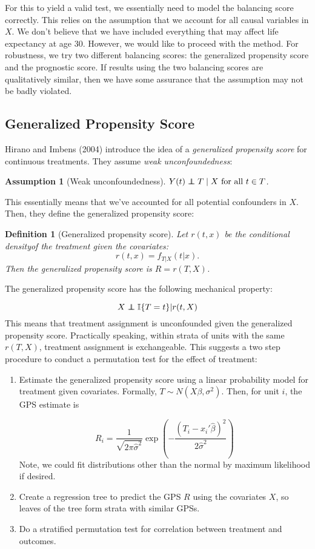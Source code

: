 \documentclass[11pt]{article}\usepackage[]{graphicx}\usepackage[]{color}
\newtheorem{assumption}{Assumption}
\newtheorem{definition}{Definition}
\newcommand{\ind}{\mathbb{I}} %
\newcommand{\normal}{N} %
\newcommand\independent{\protect\mathpalette{\protect\independenT}{\perp}}
\def\independenT#1#2{\mathrel{\rlap{$#1#2$}\mkern2mu{#1#2}}}
\begin{document}
For this to yield a valid test, we essentially need to model the balancing score correctly.
This relies on the assumption that we account for all causal variables in $X$.
We don't believe that we have included everything that may affect life expectancy at age 30.
However, we would like to proceed with the method.
For robustness, we try two different balancing scores: the generalized propensity score and the prognostic score.
If results using the two balancing scores are qualitatively similar, then we have some assurance that the assumption may not be badly violated.

\subsection{Generalized Propensity Score}
Hirano and Imbens (2004) introduce the idea of a \textit{generalized propensity score} for continuous treatments.
They assume \textit{weak unconfoundedness}:
\begin{assumption}[Weak unconfoundedness] $Y(t) \independent T \mid X \text{ for all } t \in T$.
\end{assumption}
This essentially means that we've accounted for all potential confounders in $X$.
Then, they define the generalized propensity score:

\begin{definition}[Generalized propensity score]
Let $r(t, x)$ be the conditional densityof the treatment given the covariates:
$$r(t, x) = f_{T | X} (t|x).$$ 
Then the generalized propensity score is $R = r(T, X)$.
\end{definition}

The generalized propensity score has the following mechanical property:

$$X \independent \ind\{T = t\} \vert r(t, X)$$
This means that treatment assignment is unconfounded given the generalized propensity score.
Practically speaking, within strata of units with the same $r(T, X)$, treatment assignment is exchangeable.
This suggests a two step procedure to conduct a permutation test for the effect of treatment:
\begin{enumerate}
\item Estimate the generalized propensity score using a linear probability model for treatment given covariates.
Formally, $T \sim \normal(X\beta, \sigma^2)$.
Then, for unit $i$, the GPS estimate is

$$ R_i = \frac{1}{\sqrt{2\pi\hat{\sigma}^2}}\exp\left(-\frac{(T_i - x_i'\hat{\beta})^2}{2\hat{\sigma}^2}\right)$$
Note, we could fit distributions other than the normal by maximum likelihood if desired. 
\item Create a regression tree to predict the GPS $R$ using the covariates $X$, so leaves of the tree form strata with similar GPSs.
\item Do a stratified permutation test for correlation between treatment and outcomes.
\end{enumerate}
\end{document}
